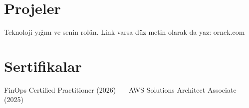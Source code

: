 \documentclass[11pt,a4paper]{article}
\begin{document}
\section{Projeler}
\begin{cvmadde}
  \item Teknoloji yığını ve senin rolün. Link varsa düz metin olarak da yaz: ornek.com
\end{cvmadde}

\section{Sertifikalar}
FinOps Certified Practitioner (2026) \ \textbar\ \ AWS Solutions Architect Associate (2025)
\end{document}
